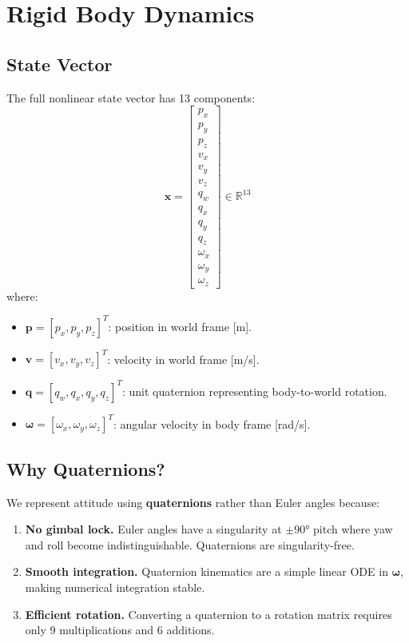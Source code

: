 \documentclass[12pt, a4paper]{article}
\newcommand{\R}{\mathbb{R}}
\newcommand{\bx}{\bm{x}}
\newcommand{\bq}{\bm{q}}
\newcommand{\bomega}{\bm{\omega}}
\begin{document}
\section{Rigid Body Dynamics}
\label{sec:dynamics}

\subsection{State Vector}

The full nonlinear state vector has 13 components:
\begin{equation}
    \bx = \begin{bmatrix}
        p_x \\ p_y \\ p_z \\ v_x \\ v_y \\ v_z \\ q_w \\ q_x \\ q_y \\ q_z \\ \omega_x \\ \omega_y \\ \omega_z
    \end{bmatrix}
    \in \R^{13}
\end{equation}
where:
\begin{itemize}
    \item $\bm{p} = [p_x, p_y, p_z]^T$: position in world frame [m].
    \item $\bm{v} = [v_x, v_y, v_z]^T$: velocity in world frame [m/s].
    \item $\bq = [q_w, q_x, q_y, q_z]^T$: unit quaternion representing body-to-world rotation.
    \item $\bomega = [\omega_x, \omega_y, \omega_z]^T$: angular velocity in body frame [rad/s].
\end{itemize}

\subsection{Why Quaternions?}

We represent attitude using \textbf{quaternions} rather than Euler angles because:
\begin{enumerate}
    \item \textbf{No gimbal lock.}  Euler angles have a singularity at $\pm 90°$ pitch where yaw and roll become indistinguishable.  Quaternions are singularity-free.
    \item \textbf{Smooth integration.}  Quaternion kinematics are a simple linear ODE in $\bomega$, making numerical integration stable.
    \item \textbf{Efficient rotation.}  Converting a quaternion to a rotation matrix requires only 9 multiplications and 6 additions.
\end{enumerate}
\end{document}
